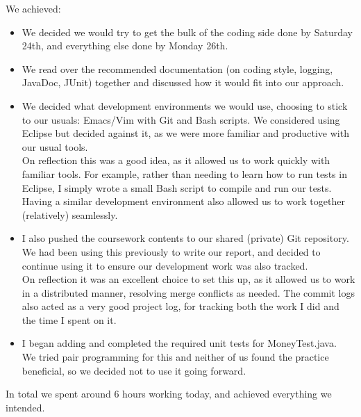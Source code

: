 \documentclass[titlepage, 12pt]{extarticle}
\begin{document}
We achieved:
\begin{itemize}
\item  We decided we would try to get the bulk of the coding side done by Saturday 24th, and everything else done by Monday 26th.
\item We read over the recommended documentation (on coding style, logging, JavaDoc, JUnit) together and discussed how it would fit into our approach.
\item We decided what development environments we would use, choosing to stick to our usuals: Emacs/Vim with Git and Bash scripts. We considered using Eclipse but decided against it, as we were more familiar and productive with our usual tools. \\ On reflection this was a good idea, as it allowed us to work quickly with familiar tools. For example, rather than needing to learn how to run tests in Eclipse, I simply wrote a small Bash script to compile and run our tests. Having a similar development environment also allowed us to work together (relatively) seamlessly.
\item I also pushed the coursework contents to our shared (private) Git repository. We had been using this previously to write our report, and decided to continue using it to ensure our development work was also tracked. \\ On reflection it was an excellent choice to set this up, as it allowed us to work in a distributed manner, resolving merge conflicts as needed. The commit logs also acted as a very good project log, for tracking both the work I did and the time I spent on it.
\item I began adding and completed the required unit tests for MoneyTest.java. \\ We tried pair programming for this and neither of us found the practice beneficial, so we decided not to use it going forward. 
\end{itemize}

In total we spent around 6 hours working today, and achieved everything we intended. 
\end{document}
